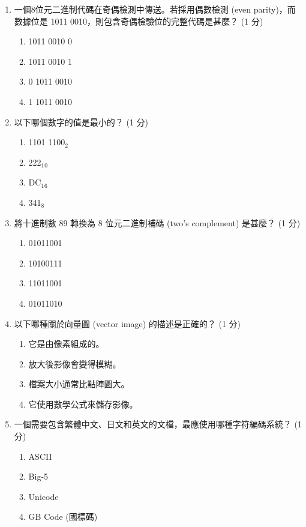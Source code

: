 \documentclass[12pt,a4paper]{article}
\begin{document}
\begin{enumerate}
    \item 一個8位元二進制代碼在奇偶檢測中傳送。若採用偶數檢測 (even parity)，而數據位是 1011 0010，則包含奇偶檢驗位的完整代碼是甚麼？ (1 分)
    \begin{enumerate}[label=\Alph*.]
        \item 1011 0010 0
        \item 1011 0010 1
        \item 0 1011 0010
        \item 1 1011 0010
    \end{enumerate}
    
    \item 以下哪個數字的值是最小的？ (1 分)
    \begin{enumerate}[label=\Alph*.]
        \item 1101 1100$_{2}$
        \item 222$_{1}$$_{0}$
        \item DC$_{1}$$_{6}$
        \item 341$_{8}$
    \end{enumerate}
    
    \item 將十進制數 89 轉換為 8 位元二進制補碼 (two's complement) 是甚麼？ (1 分)
    \begin{enumerate}[label=\Alph*.]
        \item 01011001
        \item 10100111
        \item 11011001
        \item 01011010
    \end{enumerate}
    
    \item 以下哪種關於向量圖 (vector image) 的描述是正確的？ (1 分)
    \begin{enumerate}[label=\Alph*.]
        \item 它是由像素組成的。
        \item 放大後影像會變得模糊。
        \item 檔案大小通常比點陣圖大。
        \item 它使用數學公式來儲存影像。
    \end{enumerate}
    
    \item 一個需要包含繁體中文、日文和英文的文檔，最應使用哪種字符編碼系統？ (1 分)
    \begin{enumerate}[label=\Alph*.]
        \item ASCII
        \item Big-5
        \item Unicode
        \item GB Code (國標碼)
    \end{enumerate}
    

\end{enumerate}
\end{document}
